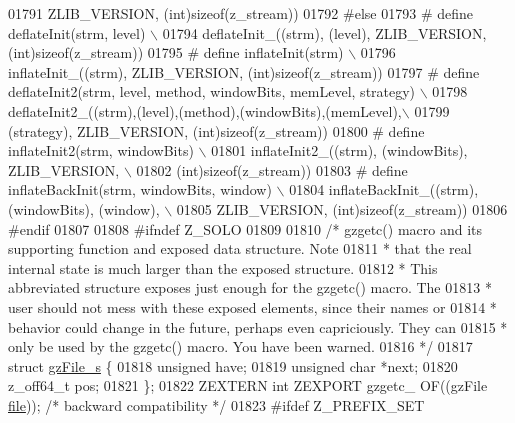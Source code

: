 \begin{DoxyCode}
01791 \textcolor{preprocessor}{                           ZLIB\_VERSION, (int)sizeof(z\_stream))}
01792 \textcolor{preprocessor}{#else}
01793 \textcolor{preprocessor}{#  define deflateInit(strm, level) \(\backslash\)}
01794 \textcolor{preprocessor}{          deflateInit\_((strm), (level), ZLIB\_VERSION, (int)sizeof(z\_stream))}
01795 \textcolor{preprocessor}{#  define inflateInit(strm) \(\backslash\)}
01796 \textcolor{preprocessor}{          inflateInit\_((strm), ZLIB\_VERSION, (int)sizeof(z\_stream))}
01797 \textcolor{preprocessor}{#  define deflateInit2(strm, level, method, windowBits, memLevel, strategy) \(\backslash\)}
01798 \textcolor{preprocessor}{          deflateInit2\_((strm),(level),(method),(windowBits),(memLevel),\(\backslash\)}
01799 \textcolor{preprocessor}{                        (strategy), ZLIB\_VERSION, (int)sizeof(z\_stream))}
01800 \textcolor{preprocessor}{#  define inflateInit2(strm, windowBits) \(\backslash\)}
01801 \textcolor{preprocessor}{          inflateInit2\_((strm), (windowBits), ZLIB\_VERSION, \(\backslash\)}
01802 \textcolor{preprocessor}{                        (int)sizeof(z\_stream))}
01803 \textcolor{preprocessor}{#  define inflateBackInit(strm, windowBits, window) \(\backslash\)}
01804 \textcolor{preprocessor}{          inflateBackInit\_((strm), (windowBits), (window), \(\backslash\)}
01805 \textcolor{preprocessor}{                           ZLIB\_VERSION, (int)sizeof(z\_stream))}
01806 \textcolor{preprocessor}{#endif}
01807 
01808 \textcolor{preprocessor}{#ifndef Z\_SOLO}
01809 
01810 \textcolor{comment}{/* gzgetc() macro and its supporting function and exposed data structure.  Note}
01811 \textcolor{comment}{ * that the real internal state is much larger than the exposed structure.}
01812 \textcolor{comment}{ * This abbreviated structure exposes just enough for the gzgetc() macro.  The}
01813 \textcolor{comment}{ * user should not mess with these exposed elements, since their names or}
01814 \textcolor{comment}{ * behavior could change in the future, perhaps even capriciously.  They can}
01815 \textcolor{comment}{ * only be used by the gzgetc() macro.  You have been warned.}
01816 \textcolor{comment}{ */}
01817 \textcolor{keyword}{struct }\hyperlink{structgz_file__s}{gzFile\_s} \{
01818     \textcolor{keywordtype}{unsigned} have;
01819     \textcolor{keywordtype}{unsigned} \textcolor{keywordtype}{char} *next;
01820     z\_off64\_t pos;
01821 \};
01822 ZEXTERN \textcolor{keywordtype}{int} ZEXPORT gzgetc\_ OF((gzFile \hyperlink{structfile}{file}));  \textcolor{comment}{/* backward compatibility */}
01823 \textcolor{preprocessor}{#ifdef Z\_PREFIX\_SET}

\end{DoxyCode}
